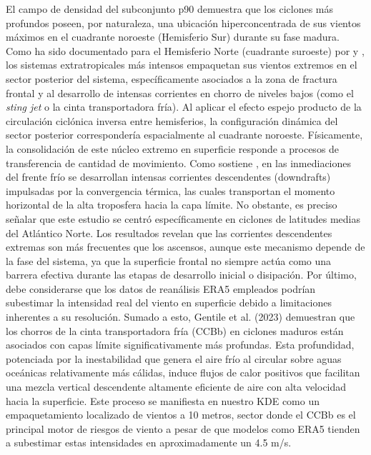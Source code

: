 El campo de densidad del subconjunto p90 demuestra que los ciclones más profundos poseen, por naturaleza, una ubicación hiperconcentrada de sus vientos máximos en el cuadrante noroeste (Hemisferio Sur) durante su fase madura. Como ha sido documentado para el Hemisferio Norte (cuadrante suroeste) por \citet{clark2005sting} y \citet{han2025system}, los sistemas extratropicales más intensos empaquetan sus vientos extremos en el sector posterior del sistema, específicamente asociados a la zona de fractura frontal y al desarrollo de intensas corrientes en chorro de niveles bajos (como el \textit{sting jet} o la cinta transportadora fría). Al aplicar el efecto espejo producto de la circulación ciclónica inversa entre hemisferios, la configuración dinámica del sector posterior correspondería espacialmente al cuadrante noroeste. Físicamente, la consolidación de este núcleo extremo en superficie responde a procesos de transferencia de cantidad de movimiento. Como sostiene \citet{hyeok2024extrem}, en las inmediaciones del frente frío se desarrollan intensas corrientes descendentes (downdrafts) impulsadas por la convergencia térmica, las cuales transportan el momento horizontal de la alta troposfera hacia la capa límite. No obstante, es preciso señalar que este estudio se centró específicamente en ciclones de latitudes medias del Atlántico Norte. Los resultados revelan que las corrientes descendentes extremas son más frecuentes que los ascensos, aunque este mecanismo depende de la fase del sistema, ya que la superficie frontal no siempre actúa como una barrera efectiva durante las etapas de desarrollo inicial o disipación. Por último, debe considerarse que los datos de reanálisis ERA5 empleados podrían subestimar la intensidad real del viento en superficie debido a limitaciones inherentes a su resolución. Sumado a esto, Gentile et al. (2023) demuestran que los chorros de la cinta transportadora fría (CCBb) en ciclones maduros están asociados con capas límite significativamente más profundas. Esta profundidad, potenciada por la inestabilidad que genera el aire frío al circular sobre aguas oceánicas relativamente más cálidas, induce flujos de calor positivos que facilitan una mezcla vertical descendente altamente eficiente de aire con alta velocidad hacia la superficie. Este proceso se manifiesta en nuestro KDE como un empaquetamiento localizado de vientos a 10 metros, sector donde el CCBb es el principal motor de riesgos de viento a pesar de que modelos como ERA5 tienden a subestimar estas intensidades en aproximadamente un 4.5 m/s.

